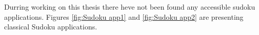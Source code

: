 \documentclass[a4paper,twoside,12pt]{book}
\begin{document}
\par
Durring working on this thesis there heve not been found any accessible sudoku applications. Figures \ref{fig:Sudoku app1} and \ref{fig:Sudoku app2} are presenting classical Sudoku applications.

\end{document}
